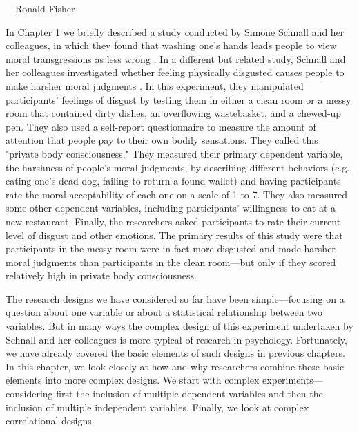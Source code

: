  {---Ronald Fisher}

In Chapter 1 we briefly described a study conducted by Simone Schnall and her colleagues, in which they found that washing one's hands leads people to view moral transgressions as less wrong \citep{schnall_clean_2008}. In a different but related study, Schnall and her colleagues investigated whether feeling physically disgusted causes people to make harsher moral judgments \citep{schnall_disgust_2008}. In this experiment, they manipulated participants' feelings of disgust by testing them in either a clean room or a messy room that contained dirty dishes, an overflowing wastebasket, and a chewed-up pen. They also used a self-report questionnaire to measure the amount of attention that people pay to their own bodily sensations. They called this "private body consciousness." They measured their primary dependent variable, the harshness of people's moral judgments, by describing different behaviors (e.g., eating one's dead dog, failing to return a found wallet) and having participants rate the moral acceptability of each one on a scale of 1 to 7. They also measured some other dependent variables, including participants' willingness to eat at a new restaurant. Finally, the researchers asked participants to rate their current level of disgust and other emotions. The primary results of this study were that participants in the messy room were in fact more disgusted and made harsher moral judgments than participants in the clean room---but only if they scored relatively high in private body consciousness.

The research designs we have considered so far have been simple---focusing on a question about one variable or about a statistical relationship between two variables. But in many ways the complex design of this experiment undertaken by Schnall and her colleagues is more typical of research in psychology. Fortunately, we have already covered the basic elements of such designs in previous chapters. In this chapter, we look closely at how and why researchers combine these basic elements into more complex designs. We start with complex experiments---considering first the inclusion of multiple dependent variables and then the inclusion of multiple independent variables. Finally, we look at complex correlational designs.

